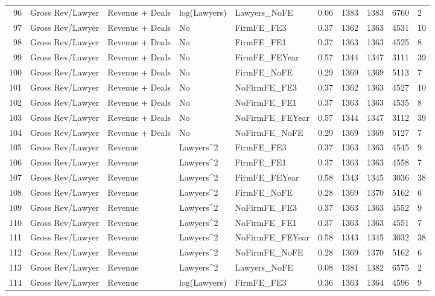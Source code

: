 \documentclass{article}
\begin{document}
\begin{table}[H]
\begin{tabular}{rlllllllll}
  96 & Gross Rev/Lawyer & Revenue + Deals & log(Lawyers) & Lawyers\_NoFE & 0.06 & 1383 & 1383 & 6760 & 2 \\ 
  97 & Gross Rev/Lawyer & Revenue + Deals & No & FirmFE\_FE3 & 0.37 & 1362 & 1363 & 4531 & 10 \\ 
  98 & Gross Rev/Lawyer & Revenue + Deals & No & FirmFE\_FE1 & 0.37 & 1363 & 1363 & 4525 & 8 \\ 
  99 & Gross Rev/Lawyer & Revenue + Deals & No & FirmFE\_FEYear & 0.57 & 1344 & 1347 & 3111 & 39 \\ 
  100 & Gross Rev/Lawyer & Revenue + Deals & No & FirmFE\_NoFE & 0.29 & 1369 & 1369 & 5113 & 7 \\ 
  101 & Gross Rev/Lawyer & Revenue + Deals & No & NoFirmFE\_FE3 & 0.37 & 1362 & 1363 & 4527 & 10 \\ 
  102 & Gross Rev/Lawyer & Revenue + Deals & No & NoFirmFE\_FE1 & 0.37 & 1363 & 1363 & 4535 & 8 \\ 
  103 & Gross Rev/Lawyer & Revenue + Deals & No & NoFirmFE\_FEYear & 0.57 & 1344 & 1347 & 3112 & 39 \\ 
  104 & Gross Rev/Lawyer & Revenue + Deals & No & NoFirmFE\_NoFE & 0.29 & 1369 & 1369 & 5127 & 7 \\ 
  105 & Gross Rev/Lawyer & Revenue & Lawyers^2 & FirmFE\_FE3 & 0.37 & 1363 & 1363 & 4545 & 9 \\ 
  106 & Gross Rev/Lawyer & Revenue & Lawyers^2 & FirmFE\_FE1 & 0.37 & 1363 & 1363 & 4558 & 7 \\ 
  107 & Gross Rev/Lawyer & Revenue & Lawyers^2 & FirmFE\_FEYear & 0.58 & 1343 & 1345 & 3036 & 38 \\ 
  108 & Gross Rev/Lawyer & Revenue & Lawyers^2 & FirmFE\_NoFE & 0.28 & 1369 & 1370 & 5162 & 6 \\ 
  109 & Gross Rev/Lawyer & Revenue & Lawyers^2 & NoFirmFE\_FE3 & 0.37 & 1363 & 1363 & 4552 & 9 \\ 
  110 & Gross Rev/Lawyer & Revenue & Lawyers^2 & NoFirmFE\_FE1 & 0.37 & 1363 & 1363 & 4551 & 7 \\ 
  111 & Gross Rev/Lawyer & Revenue & Lawyers^2 & NoFirmFE\_FEYear & 0.58 & 1343 & 1345 & 3032 & 38 \\ 
  112 & Gross Rev/Lawyer & Revenue & Lawyers^2 & NoFirmFE\_NoFE & 0.28 & 1369 & 1370 & 5162 & 6 \\ 
  113 & Gross Rev/Lawyer & Revenue & Lawyers^2 & Lawyers\_NoFE & 0.08 & 1381 & 1382 & 6575 & 2 \\ 
  114 & Gross Rev/Lawyer & Revenue & log(Lawyers) & FirmFE\_FE3 & 0.36 & 1363 & 1364 & 4596 & 9 \\ 

\end{tabular}
\end{table}
\end{document}
